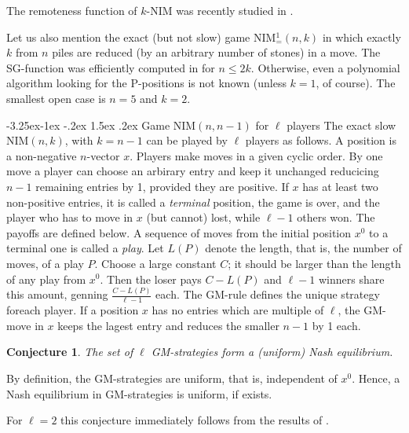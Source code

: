 \documentclass[10pt]{article}
\makeatletter
\renewcommand\subsection{\@startsection{subsection}{2}{\z@}
{-3.25ex\@plus -1ex \@minus -.2ex}
{1.5ex \@plus .2ex}
{\normalfont\normalsize\bfseries\boldmath}}
\newtheorem{conjecture}{Conjecture}
\theoremstyle{definition}
\makeatother
\begin{document}
\medskip 

The remoteness function of  $k$-NIM was recently studied 
in \cite{BGMV23}. 

\medskip 

Let us also mention 
the exact (but not slow) game NIM$^1_=(n,k)$  
\cite{BGHM15,BGHMM17} 
in which exactly $k$ from $n$ piles are reduced 
(by an arbitrary number of stones) in a move. 
The SG-function was efficiently computed 
in \cite{BGHM15,BGHMM17} for $n \leq 2k$. 
Otherwise, even a polynomial algorithm 
looking for the P-positions is not known
(unless $k=1$, of course). 
The smallest open case is  $n=5$  and  $k=2$.

\subsection{Game NIM$(n,n-1)$  for $\ell$ players} 
The exact slow NIM$(n,k)$, with $k = n-1$  
can be played by $\ell$  players  %
as follows. 
A position is a non-negative $n$-vector  $x$. 
Players make moves in a given cyclic order. 
By one move a player can choose an arbirary 
entry and keep it unchanged 
reducicing $n-1$ remaining entries by 1, 
provided they are positive. 
If  $x$  has at least two non-positive entries, 
it is called a {\em terminal} position, 
the game is over, and the player 
who has to move in $x$ (but cannot) lost, 
while  $\ell-1$  others won. 
The payoffs are defined below. 
A sequence of moves 
from the initial position  $x^0$ 
to a terminal one is called a {\em play}. 
Let  $L(P)$  denote the length, 
that is, the number of moves, of a play  $P$. 
Choose a large constant $C$; 
it should be larger than the length 
of any play from  $x^0$.  
Then the loser pays $C-L(P)$ 
and $\ell-1$  winners share this amount, 
genning $\frac{C - L(P)}{\ell-1}$ each. 
The GM-rule defines the unique strategy foreach player.
If a position  $x$  has no entries which are multiple of $\ell$, 
the GM-move in $x$ keeps the lagest entry and reduces 
the smaller $n-1$ by 1 each. 

\begin{conjecture}
\label{con-1} 
The set of $\ell$ GM-strategies form a (uniform) Nash equilibrium. 
\end{conjecture}

By definition, the GM-strategies are uniform, 
that is, independent of  $x^0$. 
Hence, a  Nash equilibrium in GM-strategies  
is uniform, if exists. 

For $\ell = 2$  this conjecture immediately 
follows from the results of \cite{GMMV23}. 
\end{document}
